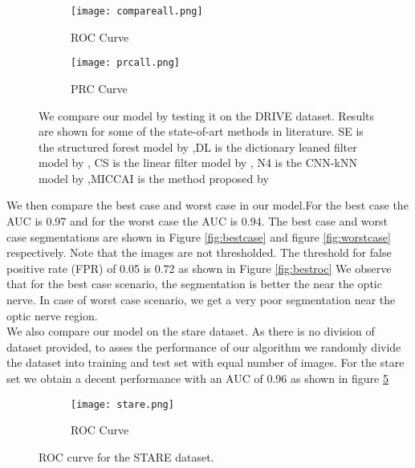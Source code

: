 \begin{figure}
	\centering
	
	\begin{subfigure}[b]{0.75\textwidth}
		\texttt{[image: compareall.png]}
		\caption{ROC Curve}
		\label{fig:com}
	\end{subfigure}
	\begin{subfigure}[b]{0.75\textwidth}
		\texttt{[image: prcall.png]}
		\caption{PRC Curve}
		\label{fig:prc1}
	\end{subfigure}
	\caption[Results on DRIVE dataset]{We compare our model by testing it on the DRIVE dataset. Results are shown for some of the state-of-art methods in literature. SE is the structured forest model by \citet{dollar2013structured},DL is the dictionary leaned filter model by \citet{rigamonti2013learning}, CS is the linear filter model by \citet{rigamonti2012accurate}, N4 is the CNN-kNN model by \citet{ganin2014n},MICCAI is the method proposed by \citet{becker2013supervised}}
	\label{fig:compareall}

\end{figure}
We then compare the best case and worst case in our model.For the best case the AUC is 0.97 and for the worst case the AUC is 0.94. The best case and worst case segmentations are shown in Figure \ref{fig:bestcase} and figure \ref{fig:worstcase} respectively. Note that the images are not thresholded. The threshold for false positive rate (FPR) of 0.05 is 0.72 as shown in Figure \ref{fig:bestroc} We observe that for the best case scenario, the segmentation is better the near the optic nerve. In case of worst case scenario, we get a very poor segmentation near the optic nerve region.\\

We also compare our model on the stare dataset. As there is no division of dataset provided, to asses the performance of our algorithm we randomly divide the dataset into training and test set with equal number of images. For the stare set we obtain a decent performance with an AUC of 0.96 as shown in figure \ref{fig:stare}
\begin{figure}
	\centering
	
	\begin{subfigure}[b]{0.75\textwidth}
		\texttt{[image: stare.png]}
		\caption{ROC Curve}
		\label{fig:stare1}
	\end{subfigure}
	\caption[ROC curve on a train test split of STARE dataset]{ROC curve for the STARE dataset.}
	\label{fig:stare}
\end{figure}

